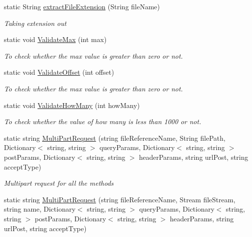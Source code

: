 \begin{DoxyCompactItemize}
\item 
static String \hyperlink{classcom_1_1shephertz_1_1app42_1_1paas_1_1sdk_1_1csharp_1_1util_1_1_util_aee68725831fc40f65b5bdb689bb060c3}{extract\+File\+Extension} (String file\+Name)
\begin{DoxyCompactList}\small\item\em Taking extension out \end{DoxyCompactList}\item 
static void \hyperlink{classcom_1_1shephertz_1_1app42_1_1paas_1_1sdk_1_1csharp_1_1util_1_1_util_a86e3d4c6614e9f2554d3db6c795a2343}{Validate\+Max} (int max)
\begin{DoxyCompactList}\small\item\em To check whether the max value is greater than zero or not. \end{DoxyCompactList}\item 
static void \hyperlink{classcom_1_1shephertz_1_1app42_1_1paas_1_1sdk_1_1csharp_1_1util_1_1_util_a9aec98fda3185a067be781186e2db3a0}{Validate\+Offset} (int offset)
\begin{DoxyCompactList}\small\item\em To check whether the max value is greater than zero or not. \end{DoxyCompactList}\item 
static void \hyperlink{classcom_1_1shephertz_1_1app42_1_1paas_1_1sdk_1_1csharp_1_1util_1_1_util_a54f423333022dafb52b15c7289129ae6}{Validate\+How\+Many} (int how\+Many)
\begin{DoxyCompactList}\small\item\em To check whether the value of how many is less than 1000 or not. \end{DoxyCompactList}\item 
static string \hyperlink{classcom_1_1shephertz_1_1app42_1_1paas_1_1sdk_1_1csharp_1_1util_1_1_util_a32655a413e38208817940c7d5b7113a1}{Multi\+Part\+Request} (string file\+Reference\+Name, String file\+Path, Dictionary$<$ string, string $>$ query\+Params, Dictionary$<$ string, string $>$ post\+Params, Dictionary$<$ string, string $>$ header\+Params, string url\+Post, string accept\+Type)
\begin{DoxyCompactList}\small\item\em Multipart request for all the methods \end{DoxyCompactList}\item 
static string \hyperlink{classcom_1_1shephertz_1_1app42_1_1paas_1_1sdk_1_1csharp_1_1util_1_1_util_aeefeaa92e258f3e4a8e19921c23fb514}{Multi\+Part\+Request} (string file\+Reference\+Name, Stream file\+Stream, string name, Dictionary$<$ string, string $>$ query\+Params, Dictionary$<$ string, string $>$ post\+Params, Dictionary$<$ string, string $>$ header\+Params, string url\+Post, string accept\+Type)

\end{DoxyCompactItemize}
